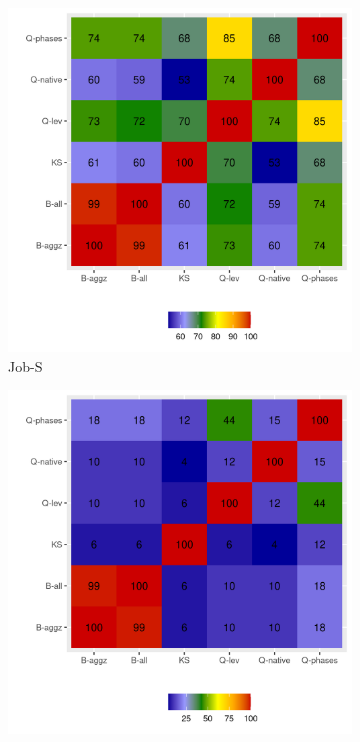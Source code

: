 \documentclass{jhps}
\begin{document}
\begin{figure}[t]
\begin{subfigure}{0.31\textwidth}
\centering
\includegraphics[width=\textwidth]{job_similarities_4296426-out/intersection-heatmap}
\caption{Job-S}\label{fig:heatmap-job-S}
\end{subfigure}
\begin{subfigure}{0.31\textwidth}
\centering
\includegraphics[width=\textwidth]{job_similarities_5024292-out/intersection-heatmap}

\end{subfigure}
\end{figure}
\end{document}
